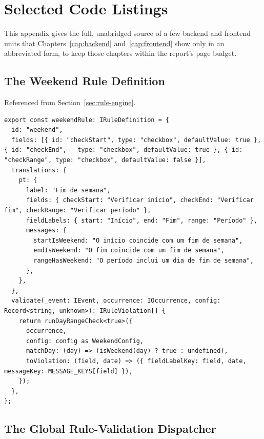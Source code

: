 %
%
\chapter{Selected Code Listings} \label{app:code-listings}

This appendix gives the full, unabridged source of a few backend and frontend units that Chapters~\ref{cap:backend} and~\ref{cap:frontend} show only in an abbreviated form, to keep those chapters within the report's page budget.

\section{The Weekend Rule Definition} \label{app:weekend-rule}

Referenced from Section~\ref{sec:rule-engine}.

\begin{lstlisting}[caption={[The Weekend rule definition, in full.]{The Weekend rule definition, in full (\texttt{server/calendar/rules/definitions/weekend.rule.ts}).}}, label={lst:weekend-rule-full}]
export const weekendRule: IRuleDefinition = {
  id: "weekend",
  fields: [{ id: "checkStart", type: "checkbox", defaultValue: true }, { id: "checkEnd",   type: "checkbox", defaultValue: true }, { id: "checkRange", type: "checkbox", defaultValue: false }],
  translations: {
    pt: {
      label: "Fim de semana",
      fields: { checkStart: "Verificar início", checkEnd: "Verificar fim", checkRange: "Verificar período" },
      fieldLabels: { start: "Início", end: "Fim", range: "Período" },
      messages: {
        startIsWeekend: "O início coincide com um fim de semana",
        endIsWeekend: "O fim coincide com um fim de semana",
        rangeHasWeekend: "O período inclui um dia de fim de semana",
      },
    },
  },
  validate(_event: IEvent, occurrence: IOccurrence, config: Record<string, unknown>): IRuleViolation[] {
    return runDayRangeCheck<true>({
      occurrence,
      config: config as WeekendConfig,
      matchDay: (day) => (isWeekend(day) ? true : undefined),
      toViolation: (field, date) => ({ fieldLabelKey: field, date, messageKey: MESSAGE_KEYS[field] }),
    });
  },
};
\end{lstlisting}

\clearpage
\section{The Global Rule-Validation Dispatcher} \label{app:collect-issues}

